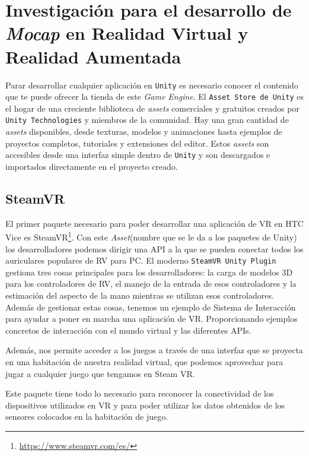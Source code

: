\section{Investigación para el desarrollo de \textit{Mocap} en Realidad Virtual y Realidad Aumentada}

Parar desarrollar cualquier aplicación en \texttt{Unity} es necesario conocer el contenido que te puede ofrecer la tienda de este \textit{Game Engine}. El \texttt{Asset Store de Unity} es el hogar de una creciente biblioteca de \textit{assets} comerciales y gratuitos creados por \texttt{Unity Technologies} y miembros de la comunidad. Hay una gran cantidad de \textit{assets} disponibles, desde texturas, modelos y animaciones hasta ejemplos de proyectos completos, tutoriales y extensiones del editor. Estos \textit{assets} son accesibles desde una interfaz simple dentro de \texttt{Unity} y son descargados e importados directamente en el proyecto creado.

\subsection{SteamVR}
\label{cap5:sec:SteamVR}

El primer paquete necesario para poder desarrollar una aplicación de VR en HTC Vice es SteamVR\footnote{\url{https://www.steamvr.com/es/}}. Con este \textit{Asset}(nombre que se le da a los paquetes de Unity) los desarrolladores podemos dirigir una API a la que se pueden conectar todos los auriculares populares de RV para PC. El moderno \texttt{SteamVR Unity Plugin} gestiona tres cosas principales para los desarrolladores: la carga de modelos 3D para los controladores de RV, el manejo de la entrada de esos controladores y la estimación del aspecto de la mano mientras se utilizan esos controladores. Además de gestionar estas cosas, tenemos un ejemplo de Sistema de Interacción para ayudar a poner en marcha una aplicación de VR. Proporcionando ejemplos concretos de interacción con el mundo virtual y las diferentes APIs. 

Además, nos permite acceder a los juegos a través de una interfaz que se proyecta en una habitación de nuestra realidad virtual, que podemos aprovechar para jugar a cualquier juego que tengamos en Steam VR.

Este paquete tiene todo lo necesario para reconocer la conectividad de los dispositivos utilizados en VR y para poder utilizar los datos obtenidos de los sensores colocados en la habitación de juego. 

